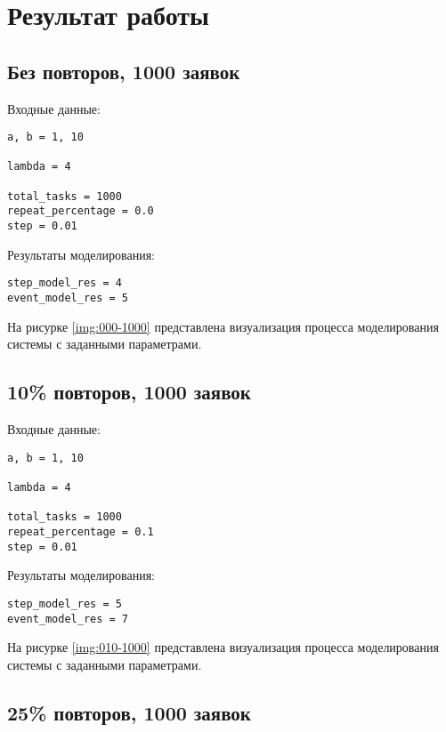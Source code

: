 \chapter{Результат работы}

\section{Без повторов, 1000 заявок}

Входные данные:

\begin{verbatim}
a, b = 1, 10

lambda = 4

total_tasks = 1000
repeat_percentage = 0.0
step = 0.01
\end{verbatim}

Результаты моделирования:

\begin{verbatim}
step_model_res = 4
event_model_res = 5
\end{verbatim}

На рисурке \ref{img:000-1000} представлена визуализация процесса моделирования системы с заданными параметрами.


\section{10\% повторов, 1000 заявок}

Входные данные:

\begin{verbatim}
a, b = 1, 10

lambda = 4

total_tasks = 1000
repeat_percentage = 0.1
step = 0.01
\end{verbatim}

Результаты моделирования:

\begin{verbatim}
step_model_res = 5
event_model_res = 7
\end{verbatim}

На рисурке \ref{img:010-1000} представлена визуализация процесса моделирования системы с заданными параметрами.


\section{25\% повторов, 1000 заявок}

